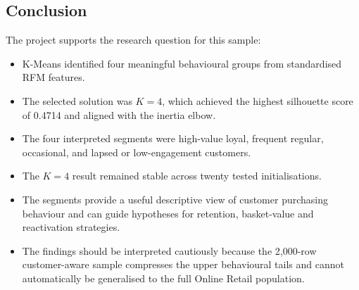 \documentclass[11pt,a4paper]{article}
\begin{document}
\clearpage
\subsection{Conclusion}
The project supports the research question for this sample:

\begin{itemize}[leftmargin=2em,itemsep=0.28em,topsep=0.4em]
\item K-Means identified four meaningful behavioural groups from standardised RFM features.
\item The selected solution was $K=4$, which achieved the highest silhouette score of 0.4714 and aligned with the inertia elbow.
\item The four interpreted segments were high-value loyal, frequent regular, occasional, and lapsed or low-engagement customers.
\item The $K=4$ result remained stable across twenty tested initialisations.
\item The segments provide a useful descriptive view of customer purchasing behaviour and can guide hypotheses for retention, basket-value and reactivation strategies.
\item The findings should be interpreted cautiously because the 2,000-row customer-aware sample compresses the upper behavioural tails and cannot automatically be generalised to the full Online Retail population.
\end{itemize}

\clearpage
\end{document}
